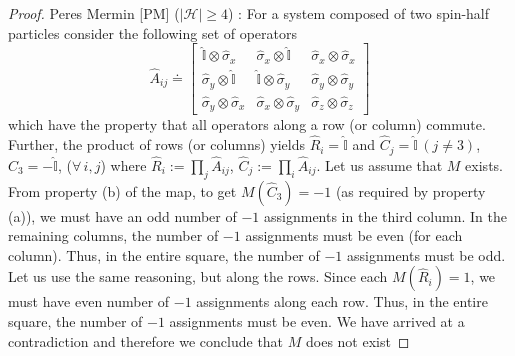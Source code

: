 \documentclass[british,aps,prl,superscriptaddress,nofootinbib,times,reprint]{revtex4-1}
\theoremstyle{plain}
\theoremstyle{plain}
\theoremstyle{definition}
\theoremstyle{remark}
\theoremstyle{remark}
\theoremstyle{remark}
\theoremstyle{plain}
\theoremstyle{plain}
\theoremstyle{plain}
\theoremstyle{definition}
\theoremstyle{definition}
\begin{document}
\begin{proof} Peres Mermin [PM]
($\left|\mathcal{H}\right|\ge4$)
\cite{Peres,Mermin}:
For a system composed of two spin-half particles 
consider the following set of operators \[
\hat{A}_{ij}\doteq\left[\begin{array}{ccc}
\hat{\mathbb{I}}\otimes\hat{\sigma}_{x} &
\hat{\sigma}_{x}\otimes\hat{\mathbb{I}} &
\hat{\sigma}_{x}\otimes\hat{\sigma}_{x}\\
\hat{\sigma}_{y}\otimes\hat{\mathbb{I}} &
\hat{\mathbb{I}}\otimes\hat{\sigma}_{y} &
\hat{\sigma}_{y}\otimes\hat{\sigma}_{y}\\
\hat{\sigma}_{y}\otimes\hat{\sigma}_{x} &
\hat{\sigma}_{x}\otimes\hat{\sigma}_{y} &
\hat{\sigma}_{z}\otimes\hat{\sigma}_{z}
\end{array}\right] \] which have the property that
all operators along a row (or column) commute. Further,
the product of rows (or columns) yields
$\hat{R}_{i}=\hat{\mathbb{I}}$ and
$\hat{C}_{j}=\hat{\mathbb{I}}\,(j\neq3)$,
$\hat{C}_{3}=-\hat{\mathbb{I}}$, ($\forall\,i,j$) where
$\hat{R}_{i}:=\prod_{j}\hat{A}_{ij}$,
$\hat{C}_{j}:=\prod_{i}\hat{A}_{ij}$. Let us
assume that $M$ exists. From property (b) of the
map, to get $M(\hat{C}_{3})=-1$ (as required by
property (a)), we must have an odd number of $-1$
assignments in the third column. In the remaining
columns, the number of $-1$ assignments must be
even (for each column). Thus, in the entire
square, the number of $-1$ assignments must be
odd. Let us use the same reasoning, but along the
rows. Since each $M(\hat{R}_{i})=1$, we must have
even number of $-1$ assignments along each row.
Thus, in the entire square, the number of $-1$
assignments must be even. We have arrived at a
contradiction and therefore we conclude 
that $M$ does not exist
\end{proof}
\end{document}
